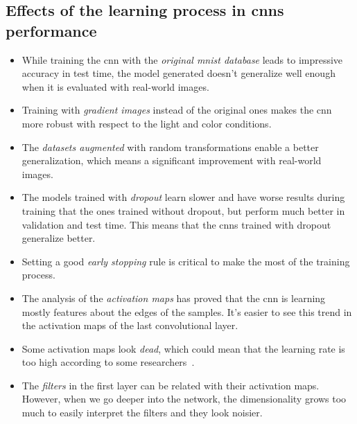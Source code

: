 \subsection*{Effects of the learning process in \glspl{cnn} performance}
\begin{itemize}
	\item While training the \gls{cnn} with the \emph{original \gls{mnist} database} leads to impressive accuracy in test time, the model generated doesn't generalize well enough when it is evaluated with real-world images.
	\item Training with \emph{gradient images} instead of the original ones makes the \gls{cnn} more robust with respect to the light and color conditions.
	\item The \emph{datasets augmented} with random transformations enable a better generalization, which means a significant improvement with real-world images.
	\item The models trained with \emph{dropout} learn slower and have worse results during training that the ones trained without dropout, but perform much better in validation and test time. This means that the \glspl{cnn} trained with dropout generalize better. 
	\item Setting a good \emph{early stopping} rule is critical to make the most of the training process. 
	\item The analysis of the \emph{activation maps} has proved that the \gls{cnn} is learning mostly features about the edges of the samples. It's easier to see this trend in the activation maps of the last convolutional layer.
	\item Some activation maps look \textit{dead}, which could mean that the learning rate is too high according to some researchers~\cite{cs231n}.
	\item The \emph{filters} in the first layer can be related with their activation maps. However, when we go deeper into the network, the dimensionality grows too much to easily interpret the filters and they look noisier. 
\end{itemize}

